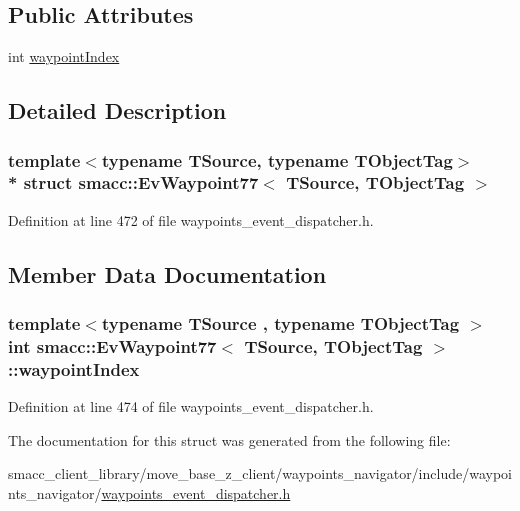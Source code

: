 \subsection*{Public Attributes}
\begin{DoxyCompactItemize}
\item 
int \hyperlink{structsmacc_1_1EvWaypoint77_a42207e66a654d1c38cecbaede9408c55}{waypoint\+Index}
\end{DoxyCompactItemize}


\subsection{Detailed Description}
\subsubsection*{template$<$typename T\+Source, typename T\+Object\+Tag$>$\\*
struct smacc\+::\+Ev\+Waypoint77$<$ T\+Source, T\+Object\+Tag $>$}



Definition at line 472 of file waypoints\+\_\+event\+\_\+dispatcher.\+h.



\subsection{Member Data Documentation}
\subsubsection[{\texorpdfstring{waypoint\+Index}{waypointIndex}}]{\setlength{\rightskip}{0pt plus 5cm}template$<$typename T\+Source , typename T\+Object\+Tag $>$ int {\bf smacc\+::\+Ev\+Waypoint77}$<$ T\+Source, T\+Object\+Tag $>$\+::waypoint\+Index}\hypertarget{structsmacc_1_1EvWaypoint77_a42207e66a654d1c38cecbaede9408c55}{}\label{structsmacc_1_1EvWaypoint77_a42207e66a654d1c38cecbaede9408c55}


Definition at line 474 of file waypoints\+\_\+event\+\_\+dispatcher.\+h.



The documentation for this struct was generated from the following file\+:\begin{DoxyCompactItemize}
\item 
smacc\+\_\+client\+\_\+library/move\+\_\+base\+\_\+z\+\_\+client/waypoints\+\_\+navigator/include/waypoints\+\_\+navigator/\hyperlink{waypoints__event__dispatcher_8h}{waypoints\+\_\+event\+\_\+dispatcher.\+h}\end{DoxyCompactItemize}
